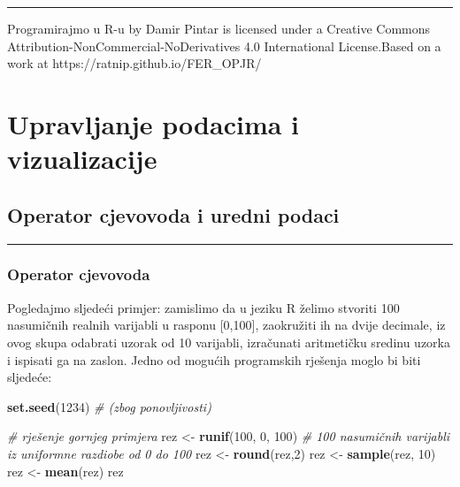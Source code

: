 \documentclass[]{book}
\newenvironment{Shaded}{\begin{snugshade}}{\end{snugshade}}
\newcommand{\KeywordTok}[1]{\textcolor[rgb]{0.13,0.29,0.53}{\textbf{#1}}}
\newcommand{\DecValTok}[1]{\textcolor[rgb]{0.00,0.00,0.81}{#1}}
\newcommand{\StringTok}[1]{\textcolor[rgb]{0.31,0.60,0.02}{#1}}
\newcommand{\CommentTok}[1]{\textcolor[rgb]{0.56,0.35,0.01}{\textit{#1}}}
\newcommand{\NormalTok}[1]{#1}
\theoremstyle{definition}
\theoremstyle{definition}
\theoremstyle{definition}
\theoremstyle{remark}
\begin{document}
\begin{center}\rule{0.5\linewidth}{\linethickness}\end{center}

{Programirajmo u R-u} by Damir Pintar is licensed under a Creative
Commons Attribution-NonCommercial-NoDerivatives 4.0 International
License.Based on a work at https://ratnip.github.io/FER\_OPJR/

\part{Upravljanje podacima i
vizualizacije}\label{part-upravljanje-podacima-i-vizualizacije}

\chapter{Operator cjevovoda i uredni podaci}\label{cijev}

\begin{center}\rule{0.5\linewidth}{\linethickness}\end{center}

\section{Operator cjevovoda}\label{operator-cjevovoda}

Pogledajmo sljedeći primjer: zamislimo da u jeziku R želimo stvoriti 100
nasumičnih realnih varijabli u rasponu {[}0,100{]}, zaokružiti ih na
dvije decimale, iz ovog skupa odabrati uzorak od 10 varijabli,
izračunati aritmetičku sredinu uzorka i ispisati ga na zaslon. Jedno od
mogućih programskih rješenja moglo bi biti sljedeće:

\begin{Shaded}
\begin{Highlighting}[]
\KeywordTok{set.seed}\NormalTok{(}\DecValTok{1234}\NormalTok{)  }\CommentTok{# (zbog ponovljivosti)}

\CommentTok{# rješenje gornjeg primjera}
\NormalTok{rez <-}\StringTok{ }\KeywordTok{runif}\NormalTok{(}\DecValTok{100}\NormalTok{, }\DecValTok{0}\NormalTok{, }\DecValTok{100}\NormalTok{) }\CommentTok{# 100 nasumičnih varijabli iz uniformne razdiobe od 0 do 100}
\NormalTok{rez <-}\StringTok{ }\KeywordTok{round}\NormalTok{(rez,}\DecValTok{2}\NormalTok{)}
\NormalTok{rez <-}\StringTok{ }\KeywordTok{sample}\NormalTok{(rez, }\DecValTok{10}\NormalTok{)}
\NormalTok{rez <-}\StringTok{ }\KeywordTok{mean}\NormalTok{(rez)}
\NormalTok{rez}
\end{Highlighting}
\end{Shaded}
\end{document}
